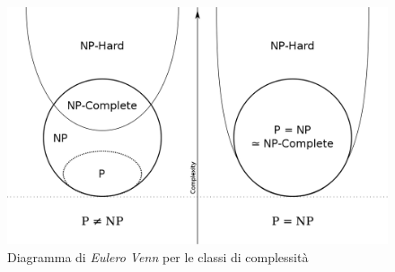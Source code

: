 \documentclass[a4paper,12pt, oneside]{book}
\begin{document}
\begin{figure}[H]
  \centering
  \includegraphics[scale = 0.3]{img/problem.png}
  \caption{Diagramma di \emph{Eulero Venn} per le classi di complessità}
  \label{fig:complexity}
\end{figure}
\end{document}
